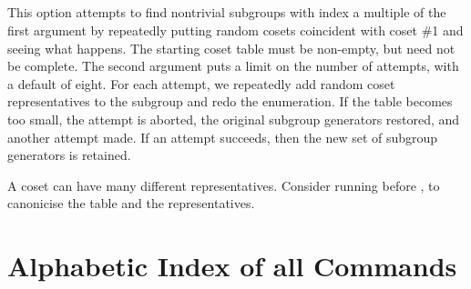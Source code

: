\subsection{}
\label{cmd:rc}
\label{cmd:random coincidences}

This option attempts to find nontrivial subgroups with index a multiple
  of the first argument by repeatedly putting random cosets coincident
  with coset \#1 and seeing what happens.
The starting coset table must be non-empty, but need not be complete.
The second argument puts a limit on the number of attempts, with a default
  of eight.
For each attempt, we repeatedly add random coset representatives to the 
  subgroup and redo the enumeration.
If the table becomes too small, the attempt is aborted, the original 
  subgroup generators restored, and another attempt made.
If an attempt succeeds, then the new set of subgroup generators is
  retained.

A coset can have many different representatives.
Consider running  before , to canonicise the table and the
  representatives.

\newpage
\section{Alphabetic Index of all Commands}
\label{sec:alphind}

